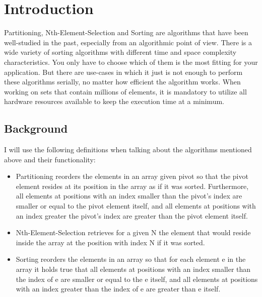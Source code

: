 \documentclass[sigconf]{acmart}
\begin{document}
\let\thefootnote\relax{}

\section{Introduction}

Partitioning, Nth-Element-Selection and Sorting are algorithms that have been well-studied in the past, especially from an algorithmic point of view. There is a wide variety of sorting algorithms with different time and space complexity characteristics. You only have to choose which of them is the most fitting for your application. But there are use-cases in which it just is not enough to perform these algorithms serially, no matter how efficient the algorithm works. When working on sets that contain millions of elements, it is mandatory to utilize all hardware resources available to keep the execution time at a minimum.

\subsection{Background}

I will use the following definitions when talking about the algorithms mentioned above and their functionality:

\begin{itemize}
    \item Partitioning reorders the elements in an array given pivot so that the pivot element resides at its position in the array as if it was sorted. Furthermore, all elements at positions with an index smaller than the pivot's index are smaller or equal to the pivot element itself, and all elements at positions with an index greater the pivot's index are greater than the pivot element itself.
    \item Nth-Element-Selection retrieves for a given N the element that would reside inside the array at the position with index N if it was sorted. 
    \item Sorting reorders the elements in an array so that for each element e in the array it holds true that all elements at positions with an index smaller than the index of e are smaller or equal to the e itself, and all elements at positions with an index greater than the index of e are greater than e itself.
\end{itemize}
\end{document}
